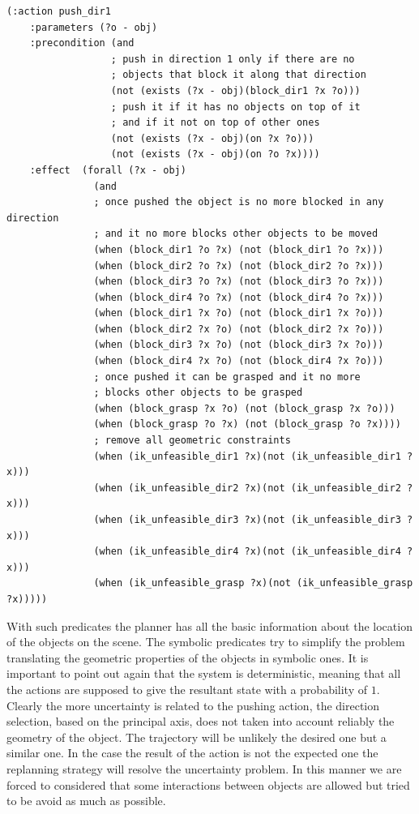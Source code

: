 \lstset{language=pddl}
\begin{lstlisting}[caption={PDDL syntax of the pushing action along direction 1},label=pushPDDL]
(:action push_dir1
    :parameters (?o - obj)
    :precondition (and
                  ; push in direction 1 only if there are no
                  ; objects that block it along that direction
                  (not (exists (?x - obj)(block_dir1 ?x ?o)))
                  ; push it if it has no objects on top of it
                  ; and if it not on top of other ones
                  (not (exists (?x - obj)(on ?x ?o)))
                  (not (exists (?x - obj)(on ?o ?x))))
    :effect  (forall (?x - obj)
               (and
               ; once pushed the object is no more blocked in any direction
               ; and it no more blocks other objects to be moved
               (when (block_dir1 ?o ?x) (not (block_dir1 ?o ?x)))
               (when (block_dir2 ?o ?x) (not (block_dir2 ?o ?x)))
               (when (block_dir3 ?o ?x) (not (block_dir3 ?o ?x)))
               (when (block_dir4 ?o ?x) (not (block_dir4 ?o ?x)))
               (when (block_dir1 ?x ?o) (not (block_dir1 ?x ?o)))
               (when (block_dir2 ?x ?o) (not (block_dir2 ?x ?o)))
               (when (block_dir3 ?x ?o) (not (block_dir3 ?x ?o)))
               (when (block_dir4 ?x ?o) (not (block_dir4 ?x ?o)))
               ; once pushed it can be grasped and it no more
               ; blocks other objects to be grasped
               (when (block_grasp ?x ?o) (not (block_grasp ?x ?o)))
               (when (block_grasp ?o ?x) (not (block_grasp ?o ?x))))
               ; remove all geometric constraints 
               (when (ik_unfeasible_dir1 ?x)(not (ik_unfeasible_dir1 ?x)))
               (when (ik_unfeasible_dir2 ?x)(not (ik_unfeasible_dir2 ?x)))
               (when (ik_unfeasible_dir3 ?x)(not (ik_unfeasible_dir3 ?x)))
               (when (ik_unfeasible_dir4 ?x)(not (ik_unfeasible_dir4 ?x)))
               (when (ik_unfeasible_grasp ?x)(not (ik_unfeasible_grasp ?x)))))
\end{lstlisting}

\mbox{}


With such predicates the planner has all the basic information about the location of the objects on the scene. The symbolic predicates try to simplify the problem translating the geometric properties of the objects in symbolic ones. It is important to point out again that the system is deterministic, meaning that all the actions are supposed to give the resultant state with a probability of $1$. Clearly the more uncertainty is related to the pushing action, the direction selection, based on the principal axis, does not taken into account reliably the geometry of the object. The trajectory will be unlikely the desired one but a similar one. In the case the result of the action is not the expected one the replanning strategy will resolve the uncertainty problem. In this manner we are forced to considered that some interactions between objects are allowed but tried to be avoid as much as possible. 

